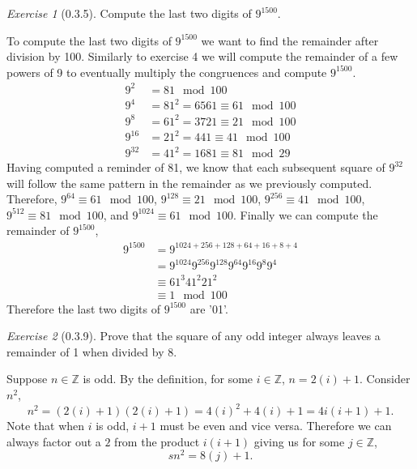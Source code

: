 \documentclass[12pt]{amsart}
\makeatletter
\theoremstyle{remark}
\newtheorem*{exercise}{Exercise}%
\def\ZZ{\ensuremath{\mathbb Z}}
\renewenvironment{proof}[1][\proofname]{\par\doublespacing
  \pushQED{\qed}%
  \normalfont \topsep6\p@\@plus6\p@\relax
  \list{}{%
    \settowidth{\leftmargin}{\itshape\proofname:\hskip\labelsep}%
    \setlength{\labelwidth}{0pt}%
    \setlength{\itemindent}{-\leftmargin}%
  }%
  \item[\hskip\labelsep\itshape#1\@addpunct{:}]\ignorespaces
}{%
  \popQED\endlist\@endpefalse
  \singlespacing
}
\theoremstyle{mycomment}
\makeatother
\begin{document}
\begin{exercise}[0.3.5] Compute the last two digits of $9^{1500}$.
  \begin{proof}[Solution:] To compute the last two digits of $9^{1500}$ we want to find the remainder after division by 100. 
    Similarly to exercise 4 we will compute the remainder of a few powers of 9 to eventually multiply the congruences and compute $9^{1500}$.
    \begin{align*}
      9^2 &= 81 \mod 100\\
      9^4 &= 81^2 = 6561\equiv 61\mod 100\\
      9^8 &= 61^2 = 3721 \equiv 21\mod 100\\
      9^{16} &= 21^2 = 441 \equiv 41\mod 100\\
      9^{32} &= 41^2 = 1681 \equiv 81\mod 29
    \end{align*}
    Having computed a reminder of 81, we know that each subsequent square of $9^{32}$ will follow the same pattern in the remainder as we previously computed. Therefore, 
    $9^{64} \equiv 61\mod 100$, $9^{128} \equiv 21\mod 100$, $9^{256} \equiv 41\mod 100$, $9^{512} \equiv 81\mod 100$, and $9^{1024} \equiv 61\mod 100$.
    Finally we can compute the remainder of $9^{1500}$, 
    \begin{align*}
      9^{1500} &= 9^{1024 + 256 + 128 + 64 + 16 + 8 + 4}\\
      &= 9^{1024}9^{256}9^{128}9^{64}9^{16}9^{8}9^{4}\\
      &\equiv 61^3 41^2 21^2\\
      &\equiv 1 \mod 100
    \end{align*}
    Therefore the last two digits of $9^{1500}$ are '01'.
  \end{proof}
\end{exercise}


\begin{exercise}[0.3.9]Prove that the square of any odd integer always leaves a remainder of 1 when divided by 8.
  \begin{proof} Suppose $n \in \ZZ$ is odd. By the definition, for some $i \in \ZZ$, $n = 2(i) + 1$.
    Consider $n^2$,
    \begin{equation*}
      n^2 = (2(i) + 1)(2(i) + 1) = 4(i)^2 + 4(i) + 1 = 4i(i + 1) + 1.
    \end{equation*}
    Note that when $i$ is odd, $i + 1$ must be even and vice versa. Therefore we can always factor out a $2$ from the product $i(i + 1)$ giving us
    for some $j \in \ZZ$, 
    \begin{equation*}s
      n^2 = 8(j) + 1.
    \end{equation*}
  \end{proof}
\end{exercise}
\end{document}
